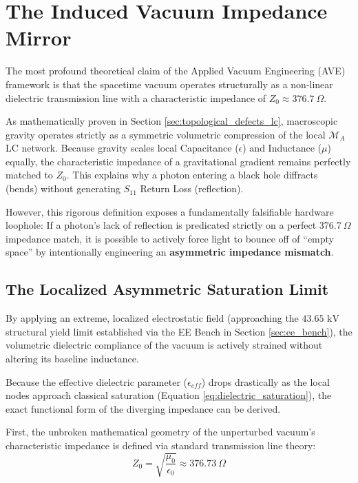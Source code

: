 \section{The Induced Vacuum Impedance Mirror}
\label{sec:induced_vacuum_impedance_mirror}

The most profound theoretical claim of the Applied Vacuum Engineering (AVE) framework is that the spacetime vacuum operates structurally as a non-linear dielectric transmission line with a characteristic impedance of $Z_0 \approx 376.7\ \Omega$. 

As mathematically proven in Section \ref{sec:topological_defects_lc}, macroscopic gravity operates strictly as a symmetric volumetric compression of the local $\mathcal{M}_A$ LC network. Because gravity scales local Capacitance ($\epsilon$) and Inductance ($\mu$) equally, the characteristic impedance of a gravitational gradient remains perfectly matched to $Z_0$. This explains why a photon entering a black hole diffracts (bends) without generating $S_{11}$ Return Loss (reflection). 

However, this rigorous definition exposes a fundamentally falsifiable hardware loophole: If a photon's lack of reflection is predicated strictly on a perfect $376.7\ \Omega$ impedance match, it is possible to actively force light to bounce off of ``empty space'' by intentionally engineering an \textbf{asymmetric impedance mismatch}. 

\subsection{The Localized Asymmetric Saturation Limit}

By applying an extreme, localized electrostatic field (approaching the $43.65\text{ kV}$ structural yield limit established via the EE Bench in Section \ref{sec:ee_bench}), the volumetric dielectric compliance of the vacuum is actively strained without altering its baseline inductance. 

Because the effective dielectric parameter ($\epsilon_{eff}$) drops drastically as the local nodes approach classical saturation (Equation \ref{eq:dielectric_saturation}), the exact functional form of the diverging impedance can be derived. 

First, the unbroken mathematical geometry of the unperturbed vacuum's characteristic impedance is defined via standard transmission line theory:
\begin{equation}
Z_0 = \sqrt{\frac{\mu_0}{\epsilon_0}} \approx 376.73\ \Omega
\end{equation}

